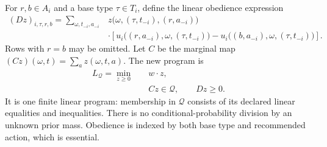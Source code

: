\documentclass[11pt]{article}
\theoremstyle{definition}
\theoremstyle{remark}
\begin{document}
For $r,b\in A_i$ and a base type $\tau\in T_i$, define the linear
obedience expression
\begin{align*}
 (Dz)_{i,\tau,r,b}
 =\sum_{\omega,t_{-i},a_{-i}}
 &z\bigl(\omega,(\tau,t_{-i}),(r,a_{-i})\bigr)\\[-2pt]
 &\cdot\left[u_i\bigl((r,a_{-i}),\omega,(\tau,t_{-i})\bigr)
       -u_i\bigl((b,a_{-i}),\omega,(\tau,t_{-i})\bigr)\right].
\end{align*}
Rows with $r=b$ may be omitted. Let $C$ be the marginal map
$(Cz)(\omega,t)=\sum_a z(\omega,t,a)$. The new program is
\begin{align}
 L_{\mathcal Q}=\min_{z\geq0}\quad & w\cdot z,\label{lp:base}\\
 &Cz\in\mathcal Q,\qquad Dz\geq0.\nonumber
\end{align}
It is one finite linear program: membership in $\mathcal Q$ consists
of its declared linear equalities and inequalities. There is no
conditional-probability division by an unknown prior mass. Obedience
is indexed by both base type and recommended action, which is essential.
\end{document}
